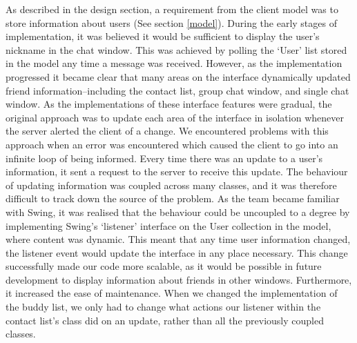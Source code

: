 As described in the design section, a requirement from the client model was to store information about users (See section \ref{model}). During the early stages of implementation, it was believed it would be sufficient to display the user's nickname in the chat window. This was achieved by polling the `User' list stored in the model any time a message was received. However, as the implementation progressed it became clear that many areas on the interface dynamically updated friend information--including the contact list, group chat window, and single chat window. As the implementations of these interface features were gradual, the original approach was to update each area of the interface in isolation whenever the server alerted the client of a change. We encountered problems with this approach when an error was encountered which caused the client to go into an infinite loop of being informed. Every time there was an update to a user's information, it sent a request to the server to receive this update. The behaviour of updating information was coupled across many classes, and it was therefore difficult to track down the source of the problem. As the team became familiar with Swing, it was realised that the behaviour could be uncoupled to a degree by implementing Swing's `listener' interface on the User collection in the model, where content was dynamic. This meant that any time user information changed, the listener event would update the interface in any place necessary. This change successfully made our code more scalable, as it would be possible in future development to display information about friends in other windows. Furthermore, it increased the ease of maintenance. When we changed the implementation of the buddy list, we only had to change what actions our listener within the contact list's class did on an update, rather than all the previously coupled classes. 

